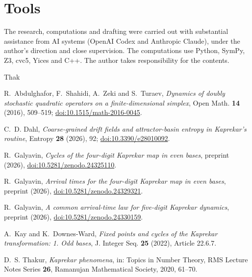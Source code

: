 \documentclass[11pt,reqno]{amsart}
\begin{document}
\section*{Tools}
The research, computations and drafting were carried out with substantial
assistance from AI systems (OpenAI Codex and Anthropic Claude), under the
author's direction and close supervision. The computations use Python, SymPy,
Z3, cvc5, Yices and C++. The author takes responsibility for the contents.

\begingroup\raggedright
\begin{thebibliography}{Thak}

R.~Abdulghafor, F.~Shahidi, A.~Zeki and S.~Turaev, \emph{Dynamics of doubly stochastic quadratic operators on a finite-dimensional simplex}, Open Math. \textbf{14} (2016), 509--519; \href{https://doi.org/10.1515/math-2016-0045}{doi:10.1515/math-2016-0045}.

C.~D. Dahl, \emph{Coarse-grained drift fields and attractor-basin entropy in Kaprekar's routine}, Entropy \textbf{28} (2026), 92; \href{https://doi.org/10.3390/e28010092}{doi:10.3390/e28010092}.

R.~Galyavin, \emph{Cycles of the four-digit Kaprekar map in even bases}, preprint (2026), \href{https://doi.org/10.5281/zenodo.24325110}{doi:10.5281/zenodo.24325110}.

R.~Galyavin, \emph{Arrival times for the four-digit Kaprekar map in even bases}, preprint (2026), \href{https://doi.org/10.5281/zenodo.24329321}{doi:10.5281/zenodo.24329321}.

R.~Galyavin, \emph{A common arrival-time law for five-digit Kaprekar dynamics}, preprint (2026), \href{https://doi.org/10.5281/zenodo.24330159}{doi:10.5281/zenodo.24330159}.

A.~Kay and K.~Downes-Ward, \emph{Fixed points and cycles of the Kaprekar transformation: 1. Odd bases}, J. Integer Seq. \textbf{25} (2022), Article 22.6.7.

D.~S. Thakur, \emph{Kaprekar phenomena}, in: Topics in Number Theory, RMS Lecture Notes Series \textbf{26}, Ramanujan Mathematical Society, 2020, 61--70.

\end{thebibliography}
\endgroup
\end{document}
